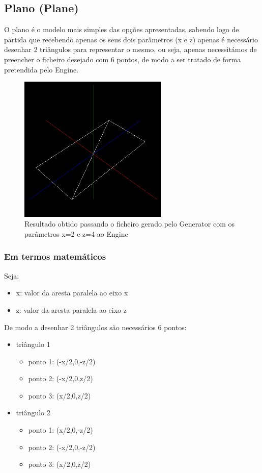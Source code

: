 \documentclass{article}
\begin{document}
\subsection{Plano (Plane)}
O plano é o modelo mais simples das opções apresentadas, sabendo logo de partida que recebendo apenas os seus dois parâmetros (x e z) apenas é necessário desenhar 2 triângulos para representar o mesmo, ou seja, apenas necessitámos de preencher o ficheiro desejado com 6 pontos, de modo a ser tratado de forma pretendida pelo Engine.

\begin{figure}[H]
\centering
\includegraphics[height=7cm]{plane.png}
\caption{Resultado obtido passando o ficheiro gerado pelo Generator com os parâmetros x=2 e z=4 ao Engine}
\end{figure}

\newpage

\subsubsection{Em termos matemáticos}
Seja:
\begin{itemize}
    \item x: valor da aresta paralela ao eixo x
    \item z: valor da aresta paralela ao eixo z
\end{itemize}
De modo a desenhar 2 triângulos são necessários 6 pontos:
\begin{itemize}
    \item triângulo 1
        \begin{itemize}
            \item ponto 1: (-x/2,0,-z/2)
            \item ponto 2: (-x/2,0,z/2)
            \item ponto 3: (x/2,0,z/2)
        \end{itemize}
    \item triângulo 2
        \begin{itemize}
            \item ponto 1: (x/2,0,-z/2)
            \item ponto 2: (-x/2,0,-z/2)
            \item ponto 3: (x/2,0,z/2)
        \end{itemize}
\end{itemize}
\end{document}
